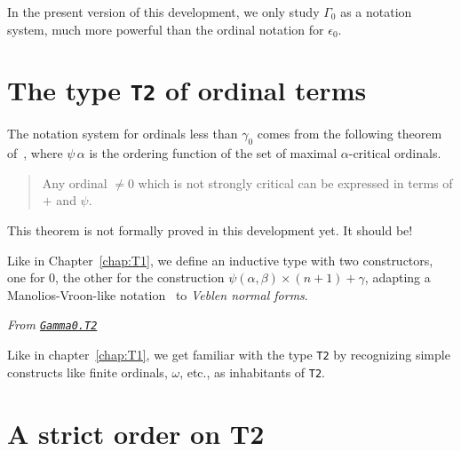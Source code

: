 {In the present version of this development, we  only study $\Gamma_0$ as a notation system, much more powerful than the ordinal notation for $\epsilon_0$.

%




\section{The type \texttt{T2} of ordinal terms}

The notation system for ordinals less than $\gamma_0$ comes from the following theorem of~\cite{schutte}, where $\psi\,\alpha$ is the ordering function 
of the set of maximal $\alpha$-critical ordinals.


\begin{quote}
  Any ordinal $\not= 0$ which is not strongly critical can be expressed in terms of $+$ and $\psi$.
\end{quote}

\begin{project}
This theorem is not formally proved in this development yet. It should be!
\end{project}


Like in Chapter~\ref{chap:T1}, we define an inductive type with two constructors, one for $0$, the other for the construction $\psi(\alpha,\beta)\times(n+1)+\gamma$, adapting a Manolios-Vroon-like notation~\cite{Manolios2005} to
\emph{Veblen normal forms}.
\label{types:T2}

\noindent\emph{From \href{../theories/html/hydras.Gamma0.T2.html\#T2}%
{\texttt{Gamma0.T2}}}




Like in chapter~\ref{chap:T1}, we get familiar with the type \texttt{T2} by recognizing simple constructs like finite ordinals, $\omega$, etc., as inhabitants of \texttt{T2}.



\section{A strict order on T2}

}
